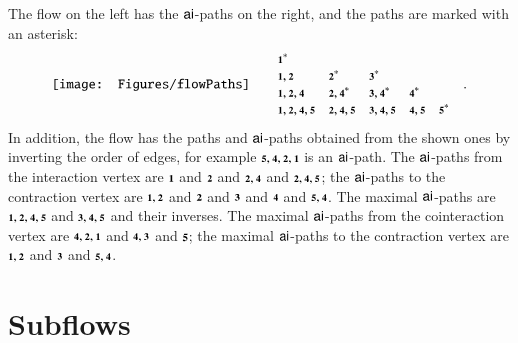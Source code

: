 \begin{example}\label{example:Paths}
The flow on the left has the ${\mathsf{ai}}$-paths on the right, and the paths are marked with an asterisk:
\[
\begin{array}{@{}c@{}c@{}}
\vcenter{\hbox{\texttt{[image: Figures/flowPaths]}}}
\qquad&
\begin{array}{@{}lllll@{}}
\one^*               &                &                  &           &       \\
\one,\two            &\two^*          &\three^*          &           &       \\
\one,\two,\four      &\two,\four^*    &\three,\four^*    &\four^*    &       \\
\one,\two,\four,\five&\two,\four,\five&\three,\four,\five&\four,\five&\five^*\\
\end{array}\quad.
\\
\end{array}
\]
In addition, the flow has the paths and ${\mathsf{ai}}$-paths obtained from the shown ones by inverting the order of edges, for example $\five,\four,\two,\one$ is an ${\mathsf{ai}}$-path. The ${\mathsf{ai}}$-paths from the interaction vertex are $\one$ and $\two$ and $\two,\four$ and $\two,\four,\five$; the ${\mathsf{ai}}$-paths to the contraction vertex are $\one,\two$ and $\two$ and $\three$ and $\four$ and $\five,\four$. The maximal ${\mathsf{ai}}$-paths are $\one,\two,\four,\five$ and $\three,\four,\five$ and their inverses. The maximal ${\mathsf{ai}}$-paths from the cointeraction vertex are $\four,\two,\one$ and $\four,\three$ and $\five$; the maximal ${\mathsf{ai}}$-paths to the contraction vertex are $\one,\two$ and $\three$ and $\five,\four$.
\end{example}

\section{Subflows}\label{section:Subflows}


